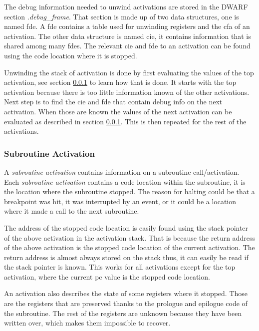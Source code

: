 The debug information needed to unwind activations are stored in the \gls{DWARF} section \emph{.debug\_frame}.
That section is made up of two data structures, one is named \gls{fde}.
A \gls{fde} contains a table used for unwinding registers and the \gls{cfa} of an activation.
The other data structure is named \gls{cie}, it contains information that is shared among many \glspl{fde}.
The relevant \gls{cie} and \gls{fde} to an activation can be found using the code location where it is stopped.


Unwinding the stack of activation is done by first evaluating the values of the top activation, see section \ref{sec:subact} to learn how that is done.
It starts with the top activation because there is too little information known of the other activations.
Next step is to find the \gls{cie} and \gls{fde} that contain debug info on the next activation.
When those are known the values of the next activation can be evaluated as described in section \ref{sec:subact}.
This is then repeated for the rest of the activations.


\subsubsection{Subroutine Activation} \label{sec:subact}
A \emph{subroutine activation} contains information on a subroutine call/activation.
Each \emph{subroutine activation} contains a code location within the subroutine, it is the location where the subroutine stopped.
The reason for halting could be that a breakpoint was hit, it was interrupted by an event, or it could be a location where it made a call to the next subroutine.


The address of the stopped code location is easily found using the stack pointer of the above activation in the activation stack.
That is because the return address of the above activation is the stopped code location of the current activation.
The return address is almost always stored on the stack thus, it can easily be read if the stack pointer is known.
This works for all activations except for the top activation, where the current \gls{pc} value is the stopped code location.


An activation also describes the state of some registers where it stopped.
Those are the registers that are preserved thanks to the prologue and epilogue code of the subroutine.
The rest of the registers are unknown because they have been written over, which makes them impossible to recover.


